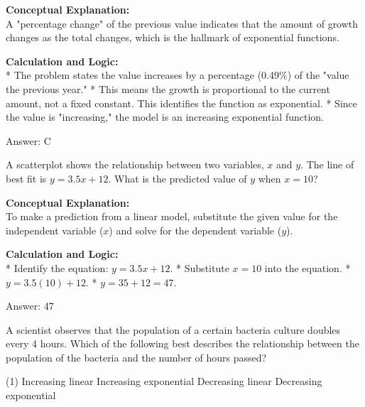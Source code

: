 \documentclass[11pt,paper=a4,answers]{exam}
\begin{document}
\begin{questions}
\begin{solution}
\textbf{Conceptual Explanation:} \\
A "percentage change" of the previous value indicates that the amount of growth changes as the total changes, which is the hallmark of exponential functions.

\vspace{30pt}

\textbf{Calculation and Logic:} \\
* The problem states the value increases by a percentage (0.49\%) of the "value the previous year."
* This means the growth is proportional to the current amount, not a fixed constant. This identifies the function as exponential.
* Since the value is "increasing," the model is an increasing exponential function.

\vspace{30pt}

Answer: \colorbox{yellow!100}{C}
\end{solution}

\vspace{60pt}

\question
A scatterplot shows the relationship between two variables, $x$ and $y$. The line of best fit is $y = 3.5x + 12$. What is the predicted value of $y$ when $x = 10$?

\begin{solution}
\textbf{Conceptual Explanation:} \\
To make a prediction from a linear model, substitute the given value for the independent variable ($x$) and solve for the dependent variable ($y$).

\vspace{30pt}

\textbf{Calculation and Logic:} \\
* Identify the equation: $y = 3.5x + 12$.
* Substitute $x = 10$ into the equation.
* $y = 3.5(10) + 12$.
* $y = 35 + 12 = 47$.

\vspace{30pt}

Answer: \colorbox{yellow!100}{47}
\end{solution}

\question
A scientist observes that the population of a certain bacteria culture doubles every 4 hours. Which of the following best describes the relationship between the population of the bacteria and the number of hours passed?
\begin{tasks}(1)
    \task Increasing linear
    \task Increasing exponential
    \task Decreasing linear
    \task Decreasing exponential
\end{tasks}


\end{questions}
\end{document}
